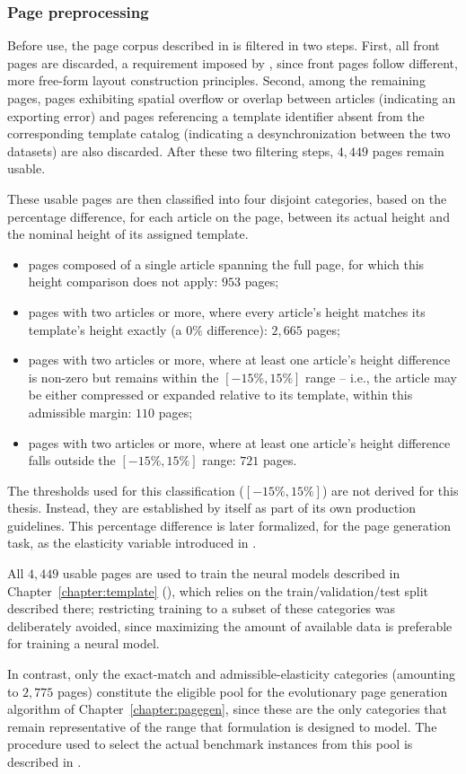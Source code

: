 \subsubsection{Page preprocessing}

Before use, the \laprovence page corpus described in  is filtered in two steps. First, all front pages are discarded, a requirement imposed by \melody, since front pages follow different, more free-form layout construction principles. Second, among the remaining pages, pages exhibiting spatial overflow or overlap between articles (indicating an exporting error) and pages referencing a template identifier absent from the corresponding template catalog (indicating a desynchronization between the two datasets) are also discarded. After these two filtering steps, $4{,}449$ pages remain usable.

These usable pages are then classified into four disjoint categories, based on the percentage difference, for each article on the page, between its actual height and the nominal height of its assigned template. 
\begin{itemize}
    \item pages composed of a single article spanning the full page, for which this height comparison does not apply: $953$ pages;
    \item pages with two articles or more, where every article's height matches its template's height exactly (a $0\%$ difference): $2{,}665$ pages;
    \item pages with two articles or more, where at least one article's height difference is non-zero but remains within the $[-15\%, 15\%]$ range -- i.e., the article may be either compressed or expanded relative to its template, within this admissible margin: $110$ pages;
    \item pages with two articles or more, where at least one article's height difference falls outside the $[-15\%, 15\%]$ range: $721$ pages.
\end{itemize}
The thresholds used for this classification ($[-15\%, 15\%]$) are not derived for this thesis. Instead, they are established by \melody itself as part of its own production guidelines. This percentage difference is later formalized, for the page generation task, as the elasticity variable introduced in .

All $4{,}449$ usable pages are used to train the neural models described in Chapter~\ref{chapter:template} (), which relies on the train/validation/test split described there; restricting training to a subset of these categories was deliberately avoided, since maximizing the amount of available data is preferable for training a neural model.

In contrast, only the exact-match and admissible-elasticity categories (amounting to $2{,}775$ pages) constitute the eligible pool for the evolutionary page generation algorithm of Chapter~\ref{chapter:pagegen}, since these are the only categories that remain representative of the range that formulation is designed to model. The procedure used to select the actual benchmark instances from this pool is described in .
